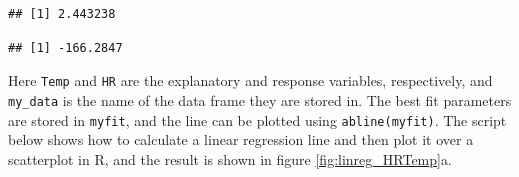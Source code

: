 \documentclass[
]{book}
\newenvironment{Shaded}{\begin{snugshade}}{\end{snugshade}}
\newcommand{\DataTypeTok}[1]{\textcolor[rgb]{0.13,0.29,0.53}{#1}}
\newcommand{\DecValTok}[1]{\textcolor[rgb]{0.00,0.00,0.81}{#1}}
\newcommand{\FloatTok}[1]{\textcolor[rgb]{0.00,0.00,0.81}{#1}}
\newcommand{\KeywordTok}[1]{\textcolor[rgb]{0.13,0.29,0.53}{\textbf{#1}}}
\newcommand{\NormalTok}[1]{#1}
\newcommand{\OperatorTok}[1]{\textcolor[rgb]{0.81,0.36,0.00}{\textbf{#1}}}
\newcommand{\StringTok}[1]{\textcolor[rgb]{0.31,0.60,0.02}{#1}}
\theoremstyle{definition}
\theoremstyle{definition}
\theoremstyle{definition}
\theoremstyle{remark}
\begin{document}
\begin{Shaded}
\end{Shaded}

\begin{verbatim}
## [1] 2.443238
\end{verbatim}

\begin{Shaded}
\end{Shaded}

\begin{verbatim}
## [1] -166.2847
\end{verbatim}

Here \texttt{Temp} and \texttt{HR} are the explanatory and response variables, respectively, and \texttt{my\_data} is the name of the data frame they are stored in. The best fit parameters are stored in \texttt{myfit}, and the line can be plotted using \texttt{abline(myfit)}. The script below shows how to calculate a linear regression line and then plot it over a scatterplot in R, and the result is shown in figure \ref{fig:linreg_HRTemp}a.

\begin{Shaded}
\end{Shaded}
\end{document}
